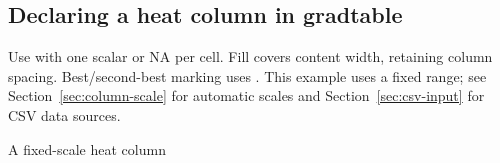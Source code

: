 \subsection{Declaring a heat column in gradtable}
Use  with one scalar or NA per cell. Fill covers content width,
retaining column spacing. Best/second-best marking uses .
This example uses a fixed range; see Section~\ref{sec:column-scale} for automatic
scales and Section~\ref{sec:csv-input} for CSV data sources.
\begin{demo}{A fixed-scale heat column}
\begin{center}
\begin{gradtable}[align=c,header align=c,width=\linewidth]
\end{gradtable}
\end{center}
\end{demo}
